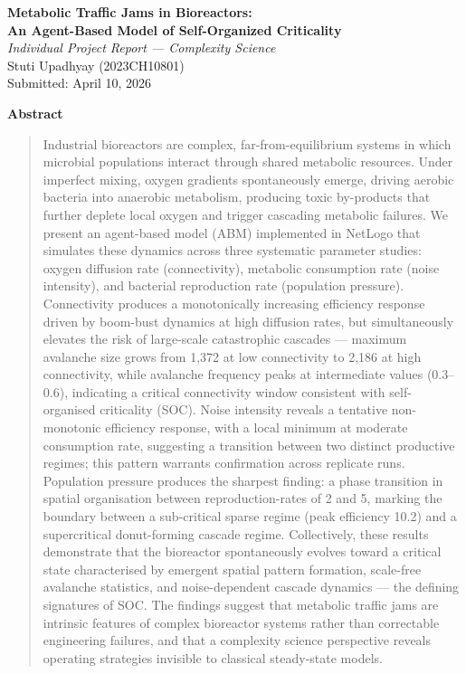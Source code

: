 \documentclass[12pt]{article}
\renewenvironment{abstract}{%
  \begin{quote}\small
}{%
  \end{quote}
}
\begin{document}
\begin{center}
  {\large\bfseries Metabolic Traffic Jams in Bioreactors:}\\[4pt]
  {\large\bfseries An Agent-Based Model of Self-Organized Criticality}\\[10pt]
  {\normalsize\itshape Individual Project Report --- Complexity Science}\\[4pt]
  {\normalsize Stuti Upadhyay (2023CH10801)}\\[4pt]
  {\normalsize Submitted: April 10, 2026}
\end{center}

\vspace{6pt}

\noindent\textbf{Abstract}

\begin{abstract}
Industrial bioreactors are complex, far-from-equilibrium systems in which 
microbial populations interact through shared metabolic resources. Under 
imperfect mixing, oxygen gradients spontaneously emerge, driving aerobic 
bacteria into anaerobic metabolism, producing toxic by-products that further 
deplete local oxygen and trigger cascading metabolic failures. We present an 
agent-based model (ABM) implemented in NetLogo that simulates these dynamics 
across three systematic parameter studies: oxygen diffusion rate (connectivity), 
metabolic consumption rate (noise intensity), and bacterial reproduction rate 
(population pressure). Connectivity produces a monotonically increasing 
efficiency response driven by boom-bust dynamics at high diffusion rates, but 
simultaneously elevates the risk of large-scale catastrophic cascades --- 
maximum avalanche size grows from 1,372 at low connectivity to 2,186 at high 
connectivity, while avalanche frequency peaks at intermediate values (0.3--0.6), 
indicating a critical connectivity window consistent with self-organised 
criticality (SOC). Noise intensity reveals a tentative non-monotonic efficiency 
response, with a local minimum at moderate consumption rate, suggesting a 
transition between two distinct productive regimes; this pattern warrants 
confirmation across replicate runs. Population pressure produces the sharpest 
finding: a phase transition in spatial organisation between reproduction-rates 
of 2 and 5, marking the boundary between a sub-critical sparse regime (peak 
efficiency 10.2) and a supercritical donut-forming cascade regime. Collectively, 
these results demonstrate that the bioreactor spontaneously evolves toward a 
critical state characterised by emergent spatial pattern formation, 
scale-free avalanche statistics, and noise-dependent cascade dynamics --- the 
defining signatures of SOC. The findings suggest that metabolic traffic jams 
are intrinsic features of complex bioreactor systems rather than correctable 
engineering failures, and that a complexity science perspective reveals 
operating strategies invisible to classical steady-state models.
\end{abstract}
\end{document}
